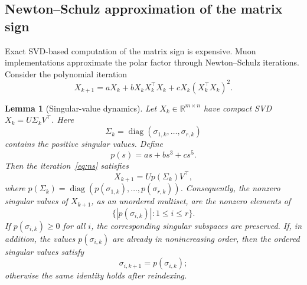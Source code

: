 \documentclass[sigconf,nonacm]{acmart}
\newtheorem{lemma}{Lemma}
\DeclareMathOperator{\diag}{diag}
\begin{document}
\subsection{Newton--Schulz approximation of the matrix sign}
Exact SVD-based computation of the matrix sign is expensive. Muon implementations approximate the polar factor through Newton--Schulz iterations. Consider the polynomial iteration
\begin{equation}\label{eq:ns}
  X_{k+1}=aX_k+bX_kX_k^\top X_k+cX_k(X_k^\top X_k)^2 .
\end{equation}

\begin{lemma}[Singular-value dynamics]\label{lem:ns}
Let $X_k\in\mathbb{R}^{m\times n}$ have compact SVD $X_k=U\Sigma_kV^\top$. Here
\[
\Sigma_k=\diag(\sigma_{1,k},\ldots,\sigma_{r,k})
\]
contains the positive singular values. Define
\begin{equation}
  p(s)=as+bs^3+cs^5 .
\end{equation}
Then the iteration~\eqref{eq:ns} satisfies
\begin{equation}
  X_{k+1}=U p(\Sigma_k)V^\top,
\end{equation}
where $p(\Sigma_k)=\diag(p(\sigma_{1,k}),\ldots,p(\sigma_{r,k}))$. Consequently, the nonzero singular values of $X_{k+1}$, as an unordered multiset, are the nonzero elements of
\begin{equation}
  \{|p(\sigma_{i,k})|:1\leq i\leq r\}.
\end{equation}
If $p(\sigma_{i,k})\geq0$ for all $i$, the corresponding singular subspaces are preserved. If, in addition, the values $p(\sigma_{i,k})$ are already in nonincreasing order, then the ordered singular values satisfy
\begin{equation}
  \sigma_{i,k+1}=p(\sigma_{i,k});
\end{equation}
otherwise the same identity holds after reindexing.
\end{lemma}
\end{document}
